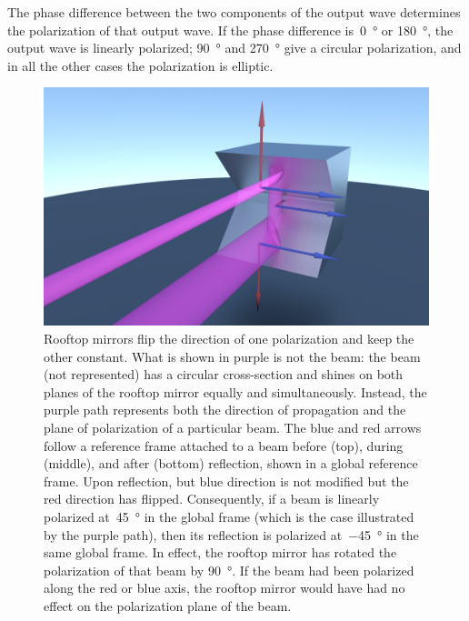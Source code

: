 The phase difference between the two components of the output wave determines the polarization of that output wave.
If the phase difference is~\SI{0}{\degree} or \SI{180}{\degree}, the output wave is linearly polarized; \SI{90}{\degree} and \SI{270}{\degree} give a circular polarization, and in all the other cases the polarization is elliptic.



\begin{figure}[b]
    \centering
    \includegraphics[width=\textwidth]{rooftop_polar_lowres}
    \caption{
        Rooftop mirrors flip the direction of one polarization and keep the other constant.
        What is shown in purple is not the beam: the beam (not represented)
        has a circular cross-section and shines on both planes of the rooftop mirror equally and simultaneously.
        Instead, the purple path represents both the direction of propagation and the plane of polarization of a particular beam.
        The blue and red arrows follow a reference frame attached to a beam before (top), during (middle), and after (bottom) reflection, shown in a global reference frame.
        Upon reflection, but blue direction is not modified but the red direction has flipped.
        Consequently, if a beam is linearly polarized at~\SI{+45}{\degree} in the global
        frame (which is the case illustrated by the purple path),
        then its reflection is polarized at~\SI{-45}{\degree} in the same global frame.
        In effect, the rooftop mirror has rotated the polarization of that beam by
        \SI{90}{\degree}.
        If the beam had been polarized along the red or blue axis, the rooftop mirror would have had no effect on the polarization plane of the beam.
    }
    \label{fig:rooftop_polar}
\end{figure}

